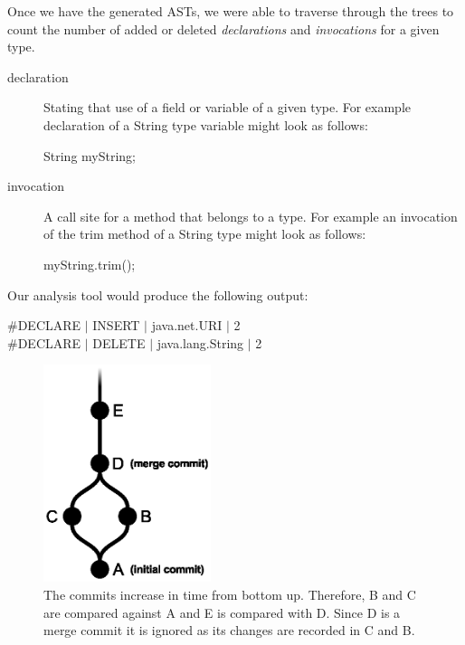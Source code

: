 \documentclass[conference]{IEEEtran}
\begin{document}
Once we have the generated ASTs, we were able to traverse through the trees to count the number of added or deleted \emph{declarations} and \emph{invocations} for a given type. 

\begin{description}
\item [declaration] 
  Stating that use of a field or variable of a given type. For example declaration of a String type variable might look as follows:
  \\
  \begin{adjustwidth}{2.5em}{0pt}
  String myString; \\
  \end{adjustwidth}
\item [invocation] 
  A call site for a method that belongs to a type. For example an invocation of the trim method of a String type might look as follows:
  \\
  \begin{adjustwidth}{2.5em}{0pt}
  myString.trim(); \\
  \end{adjustwidth}
\end{description} 

Our analysis tool would produce the following output:

\begin{adjustwidth}{2.5em}{0pt}
\#DECLARE $\vert$ INSERT $\vert$ java.net.URI $\vert$ 2 \\
\#DECLARE $\vert$ DELETE $\vert$ java.lang.String $\vert$ 2 \\
\end{adjustwidth}

\begin{figure}[!h]
\centering
\includegraphics[height=2.5in]{commits_view}
\caption{The commits increase in time from bottom up. Therefore, B and C are compared against A and E is compared with D. Since D is a merge commit it is ignored as its changes are recorded in C and B.}
\label{fig:commits_view}
\end{figure}
\end{document}
